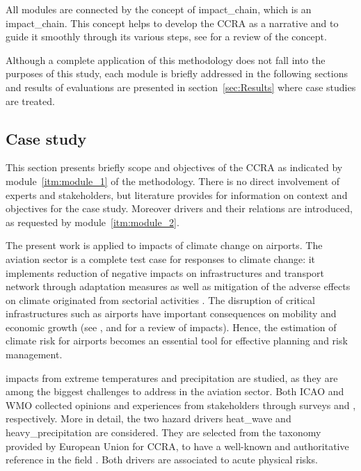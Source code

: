 All modules are connected by the concept of \gls{impact_chain}, which is an \glsdesc{impact_chain}. This concept helps to develop the \gls{CCRA} as a narrative and to guide it smoothly through its various steps, see \cite[217-224]{2022KondrupClimateAdaptation} for a review of the concept.

Although a complete application of this methodology does not fall into the purposes of this study, each module is briefly addressed in the following sections and results of evaluations are presented in section~\ref{sec:Results} where case studies are treated.



\subsection{Case study}
\label{sec:Case study}
This section presents briefly scope and objectives of the \gls{CCRA} as indicated by module~\ref{itm:module_1} of the methodology. There is no direct involvement of experts and stakeholders, but literature provides for information on context and objectives for the case study. Moreover \glspl{driver} and their relations are introduced, as requested by module~\ref{itm:module_2}.

The present work is applied to impacts of climate change on airports.
The aviation sector is a complete test case for responses to climate change: it implements reduction of negative \glspl{impact} on infrastructures and transport network through adaptation measures as well as mitigation of the adverse effects on climate originated from sectorial activities \cite{2022ICAOICAOEnvironmental}. The disruption of critical infrastructures such as airports have important consequences on mobility and economic growth (see \cite{2018ICAOClimateAdaptation}, \cite[15]{2016BurbidgeAdaptingEuropean} and \cite[548]{2022DeVivoRiskAssessment} for a review of impacts). Hence, the estimation of climate \gls{risk} for airports becomes an essential tool for effective planning and risk management.

\Glspl{impact} from extreme temperatures and precipitation are studied, as they are among the biggest challenges to address in the aviation sector. Both \Gls{ICAO} and \gls{WMO} collected opinions and experiences from stakeholders through surveys \cite[62]{2018ICAOClimateAdaptation} and \cite[34]{2020WorldMeteorologicalOrganizationWMOOutcomesOf}, respectively.
More in detail, the two \gls{hazard} \glspl{driver} \gls{heat_wave} and \gls{heavy_precipitation} are considered. They are selected from the taxonomy provided by European Union for \gls{CCRA}, to have a well-known and authoritative reference in the field \cite[177]{2024EU20212139}. Both drivers are associated to acute physical risks.

